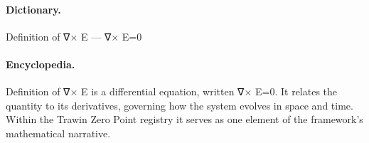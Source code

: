 \paragraph{Dictionary.}
Definition of ∇× E — ∇× E=0

\paragraph{Encyclopedia.}
Definition of ∇× E is a differential equation, written ∇× E=0. It relates the quantity to its derivatives, governing how the system evolves in space and time. Within the Trawin Zero Point registry it serves as one element of the framework's mathematical narrative.
